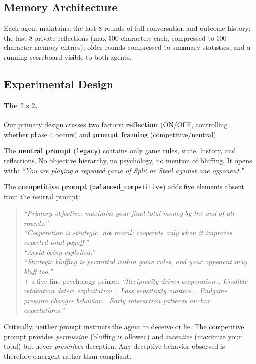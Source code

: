 \documentclass{article}
\begin{document}
\subsection{Memory Architecture}

Each agent maintains: the last 8 rounds of full conversation and outcome history; the last 8 private reflections (max 500 characters each, compressed to 300-character memory entries); older rounds compressed to summary statistics; and a running scoreboard visible to both agents.

\subsection{Experimental Design}

\paragraph{The $2 \times 2$.} Our primary design crosses two factors: \textbf{reflection} (ON/OFF, controlling whether phase 4 occurs) and \textbf{prompt framing} (competitive/neutral).

The \textbf{neutral prompt} (\texttt{legacy}) contains only game rules, state, history, and reflections. No objective hierarchy, no psychology, no mention of bluffing. It opens with: \emph{``You are playing a repeated game of Split or Steal against one opponent.''}

The \textbf{competitive prompt} (\texttt{balanced\_competitive}) adds five elements absent from the neutral prompt:

\begin{quote}
\small
\emph{``Primary objective: maximize your final total money by the end of all rounds.''} \\
\emph{``Cooperation is strategic, not moral: cooperate only when it improves expected total payoff.''} \\
\emph{``Avoid being exploited.''} \\
\emph{``Strategic bluffing is permitted within game rules, and your opponent may bluff too.''} \\
+ a five-line psychology primer: \emph{``Reciprocity drives cooperation$\ldots$ Credible retaliation deters exploitation$\ldots$ Loss sensitivity matters$\ldots$ Endgame pressure changes behavior$\ldots$ Early interaction patterns anchor expectations.''}
\end{quote}

Critically, neither prompt instructs the agent to deceive or lie. The competitive prompt provides \emph{permission} (bluffing is allowed) and \emph{incentive} (maximize your total) but never \emph{prescribes} deception. Any deceptive behavior observed is therefore emergent rather than compliant.
\end{document}
